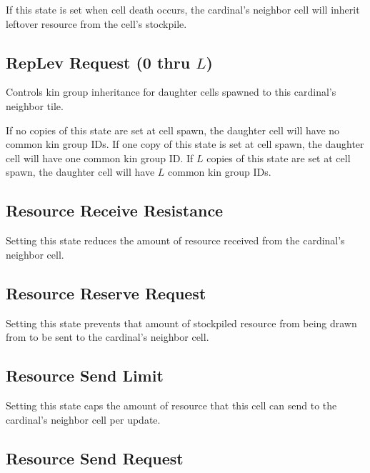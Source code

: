 
If this state is set when cell death occurs, the cardinal's neighbor cell will inherit leftover resource from the cell's stockpile.

\subsection{RepLev Request (0 thru $L$)}


Controls kin group inheritance for daughter cells spawned to this cardinal's neighbor tile.

If no copies of this state are set at cell spawn, the daughter cell will have no common kin group IDs.
If one copy of this state is set at cell spawn, the daughter cell will have one common kin group ID.
If $L$ copies of this state are set at cell spawn, the daughter cell will have $L$ common kin group IDs.

\subsection{Resource Receive Resistance}


Setting this state reduces the amount of resource received from the cardinal's neighbor cell. 

\subsection{Resource Reserve Request}


Setting this state prevents that amount of stockpiled resource from being drawn from to be sent to the cardinal's neighbor cell.

\subsection{Resource Send Limit}


Setting this state caps the amount of resource that this cell can send to the cardinal's neighbor cell per update.

\subsection{Resource Send Request}

